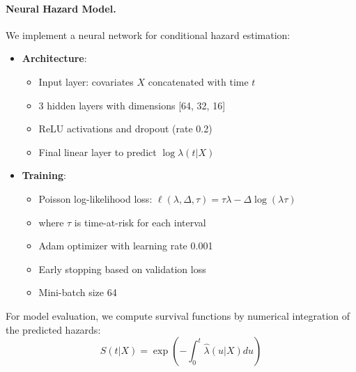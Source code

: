 \documentclass{article}
\theoremstyle{remark}
\begin{document}
\paragraph{Neural Hazard Model.}
We implement a neural network for conditional hazard estimation:
\begin{itemize}[leftmargin=15pt]
\item \textbf{Architecture}:
\begin{itemize}
\item Input layer: covariates $X$ concatenated with time $t$
\item 3 hidden layers with dimensions [64, 32, 16]
\item ReLU activations and dropout (rate 0.2)
\item Final linear layer to predict $\log\lambda(t|X)$
\end{itemize}
\item \textbf{Training}:
\begin{itemize}
\item Poisson log-likelihood loss: $\ell(\lambda, \Delta, \tau) = \tau\lambda - \Delta\log(\lambda\tau)$
\item where $\tau$ is time-at-risk for each interval
\item Adam optimizer with learning rate 0.001
\item Early stopping based on validation loss
\item Mini-batch size 64
\end{itemize}
\end{itemize}
For model evaluation, we compute survival functions by numerical integration of the predicted hazards:
\[
\hat{S}(t|X) = \exp\left(-\int_0^t \hat{\lambda}(u|X)du\right)
\]
\end{document}
